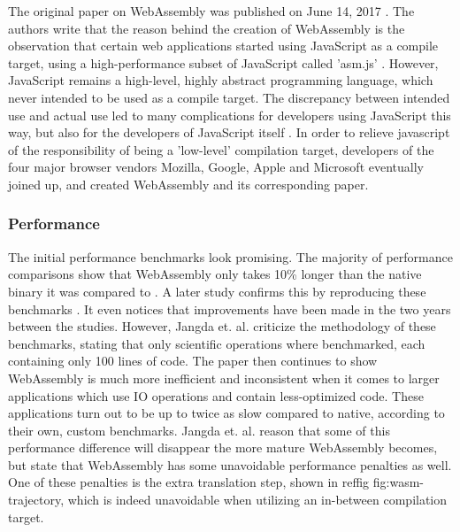 The original paper on WebAssembly was published on June 14, 2017 \cite{haas_bringing_2017}. The authors write that the reason behind the creation of WebAssembly is the observation that certain web applications started using JavaScript as a compile target, using a high-performance subset of JavaScript called 'asm.js' \cite{mozilla_asmjs_2013}. However, JavaScript remains a high-level, highly abstract programming language, which never intended to be used as a compile target. The discrepancy between intended use and actual use led to many complications for developers using JavaScript this way, but also for the developers of JavaScript itself \cite{haas_bringing_2017}. 
In order to relieve javascript of the responsibility of being a 'low-level' compilation target, developers of the four major browser vendors Mozilla, Google, Apple and Microsoft eventually joined up, and created WebAssembly and its corresponding paper.


\subsubsection*{Performance}

The initial performance benchmarks look promising. The majority of performance comparisons show that WebAssembly only takes 10\% longer than the native binary it was compared to \cite{haas_bringing_2017}. A later study confirms this by reproducing these benchmarks \cite{jangda_not_2019}. It even notices that improvements have been made in the two years between the studies. However, Jangda et. al. criticize the methodology of these benchmarks, stating that only scientific operations where benchmarked, each containing only 100 lines of code. The paper then continues to show WebAssembly is much more inefficient and inconsistent when it comes to larger applications which use IO operations and contain less-optimized code. These applications turn out to be up to twice as slow compared to native, according to their own, custom benchmarks. Jangda et. al. reason that some of this performance difference will disappear the more mature WebAssembly becomes, but state that WebAssembly has some unavoidable performance penalties as well. One of these penalties is the extra translation step, shown in reffig fig:wasm-trajectory, which is indeed unavoidable when utilizing an in-between compilation target. 


